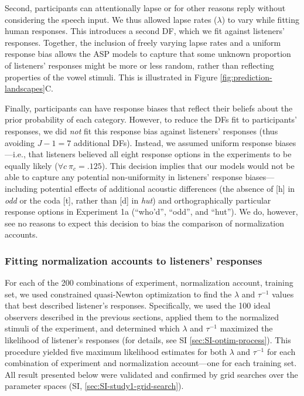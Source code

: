 \documentclass[preprint]{JASA}
\begin{document}
Second, participants can attentionally lapse or for other reasons reply without considering the speech input. We thus allowed lapse rates (\(\lambda\)) to vary while fitting human responses. This introduces a second DF, which we fit against listeners' responses. Together, the inclusion of freely varying lapse rates and a uniform response bias allows the ASP models to capture that some unknown proportion of listeners' responses might be more or less random, rather than reflecting properties of the vowel stimuli. This is illustrated in Figure \ref{fig:prediction-landscapes}C.

Finally, participants can have response biases that reflect their beliefs about the prior probability of each category. However, to reduce the DFs fit to participants' responses, we did \emph{not} fit this response bias against listeners' responses (thus avoiding \(J - 1 = 7\) additional DFs). Instead, we assumed uniform response biases---i.e., that listeners believed all eight response options in the experiments to be equally likely (\(\forall c\ \pi_c = .125\)). This decision implies that our models would not be able to capture any potential non-uniformity in listeners' response biases---including potential effects of additional acoustic differences (the absence of {[}h{]} in \emph{odd} or the coda {[}t{]}, rather than {[}d{]} in \emph{hut}) and orthographically particular response options in Experiment 1a (``who'd'', ``odd'', and ``hut''). We do, however, see no reasons to expect this decision to bias the comparison of normalization accounts.

\subsubsection{Fitting normalization accounts to listeners' responses}\label{fitting-normalization-accounts-to-listeners-responses}

For each of the 200 combinations of experiment, normalization account, training set, we used constrained quasi-Newton optimization \citep[as implemented in \texttt{R}'s \texttt{optim()} function]{byrd1995} to find the \(\lambda\) and \(\tau^{-1}\) values that best described listener's responses. Specifically, we used the 100 ideal observers described in the previous sections, applied them to the normalized stimuli of the experiment, and determined which \(\lambda\) and \(\tau^{-1}\) maximized the likelihood of listener's responses (for details, see SI \ref{sec:SI-optim-process}). This procedure yielded five maximum likelihood estimates for both \(\lambda\) and \(\tau^{-1}\) for each combination of experiment and normalization account---one for each training set. All result presented below were validated and confirmed by grid searches over the parameter spaces (SI, \ref{sec:SI-study1-grid-search}).
\end{document}
